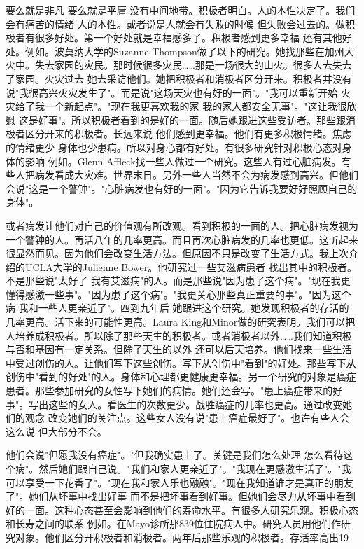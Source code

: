 要么就是非凡 要么就是平庸 没有中间地带。积极者明白。人的本性决定了。我们会有痛苦的情绪 人的本性。或者说是人就会有失败的时候 但失败会过去的。做积极者有很多好处。第一个好处就是幸福感多了。积极者感到更多幸福 还有其他好处。例如。波莫纳大学的Suzanne Thompson做了以下的研究。她找那些在加州大火中。失去家园的灾民。那时候很多灾民……那是一场很大的山火。很多人去失去了家园。火灾过去 她去采访他们。她把积极者和消极者区分开来。积极者并没有说"我很高兴火灾发生了"。而是说"这场天灾也有好的一面"。"我可以重新开始 火灾给了我一个新起点"。"现在我更喜欢我的家 我的家人都安全无事"。"这让我很欣慰 这是好事"。所以积极者看到的是好的一面。随后她跟进这些受访者。那些跟消极者区分开来的积极者。长远来说 他们感到更幸福。他们有更多积极情绪。焦虑的情绪更少 身体也少患病。所以对身心都有好处。有很多研究针对积极心态对身体的影响 例如。Glenn Affleck找一些人做过一个研究。这些人有过心脏病发。有些人把病发看成大灾难。世界末日。另外一些人当然不会为病发感到高兴。但他们会说"这是一个警钟"。"心脏病发也有好的一面"。"因为它告诉我要好好照顾自己的身体"。 

或者病发让他们对自己的价值观有所改观。看到积极的一面的人。把心脏病发视为一个警钟的人。再活八年的几率更高。而且再次心脏病发的几率也更低。这听起来很显然而见。因为他们会改变生活方法。但原因不只是改变了生活方式。我上次介绍的UCLA大学的Julienne Bower。他研究过一些艾滋病患者 找出其中的积极者。不是那些说"太好了 我有艾滋病"的人。而是那些说"因为患了这个病"。"现在我更懂得感激一些事"。"因为患了这个病"。"我更关心那些真正重要的事"。"因为这个病 我和一些人更亲近了"。四到九年后 她跟进这个研究。她发现积极者的存活的几率更高。活下来的可能性更高。Laura King和Minor做的研究表明。我们可以把人培养成积极者。所以除了那些天生的积极者。或者消极者以外……我们知道积极与否和基因有一定关系。但除了天生的以外 还可以后天培养。他们找来一些生活中受过创伤的人。让他们写下这些创伤。写下从创伤中"看到"的好处。那些写下从创伤中"看到的好处"的人。身体和心理都更健康更幸福。另一个研究的对象是癌症患者。那些参加研究的女性写下她们的病情。她们还会写。"患上癌症带来的好事"。写出这些的女人。看医生的次数更少。战胜癌症的几率也更高。通过改变她们的观念 改变她们的关注点。这些女人没有说"患上癌症最好了"。也许有些人会这么说 但大部分不会。 

他们会说"但愿我没有癌症"。"但我确实患上了。关键是我们怎么处理 怎么看待这个病"。然后她们跟自己说。"我们和家人更亲近了"。"我现在更感激生活了"。"我可以享受一下花香了"。"现在我和家人乐也融融"。"现在我知道谁才是真正的朋友了"。她们从坏事中找出好事 而不是把坏事看到好事。但她们会尽力从坏事中看到好的一面。这种心态甚至会影响到他们的寿命水平。有很多人研究乐观。积极心态和长寿之间的联系 例如。在Mayo诊所那839位住院病人中。研究人员用他们作研究对象。他们区分开积极者和消极者。两年后那些乐观的积极者。存活率高出19%

